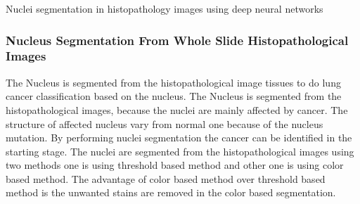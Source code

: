 \documentclass[conference]{IEEEtran}
\begin{document}

Nuclei segmentation in histopathology images using deep neural networks


\subsubsection{Nucleus Segmentation From Whole Slide Histopathological Images}
The Nucleus is segmented from the histopathological image tissues to do lung cancer classification based on the nucleus. The Nucleus is segmented from the histopathological images, because the nuclei are mainly affected by cancer. The structure of affected nucleus vary from normal one because of the nucleus mutation. By performing nuclei segmentation the cancer can be identified in the starting stage. The nuclei are segmented from the histopathological images using two methods one is using threshold based method and other one is using color based method. The advantage of color based method over threshold based method is the unwanted stains are removed in the color based segmentation.
\end{document}
